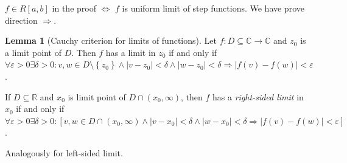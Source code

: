 \documentclass[a4paper,landscape,twocolumn]{article}
\theoremstyle{definition}
\newtheorem{lemma}{Lemma}
\newcommand\set[1]{\left\{#1\right\}}
\newcommand\abs[1]{\left|#1\right|}
\begin{document}
$f \in R[a,b]$ in the proof $\Leftrightarrow$ $f$ is uniform limit of step functions.
We have prove direction $\Rightarrow$.

\begin{lemma}[Cauchy criterion for limits of functions]
  Let $f: D \subseteq \mathbb C \to \mathbb C$ and $z_0$ is a limit point
  of $D$. Then $f$ has a limit in $z_0$ if and only if $\forall \varepsilon > 0
  \exists \delta > 0: v,w \in D\setminus\set{z_0} \land \abs{v - z_0} < \delta \land
  \abs{w - z_0} < \delta \Rightarrow \abs{f(v) - f(w)} < \varepsilon$.

  If $D \subseteq \mathbb R$ and $x_0$ is limit point of $D \cap (x_0, \infty)$,
  then $f$ has a \emph{right-sided limit} in $x_0$ if and only if
  $\forall \varepsilon > 0 \exists \delta > 0: [v,w \in D \cap (x_0, \infty)
  \land \abs{v - x_0} < \delta \land \abs{w-x_0} < \delta \Rightarrow
  \abs{f(v) - f(w)} < \varepsilon]$.

  Analogously for left-sided limit.
\end{lemma}
\end{document}
